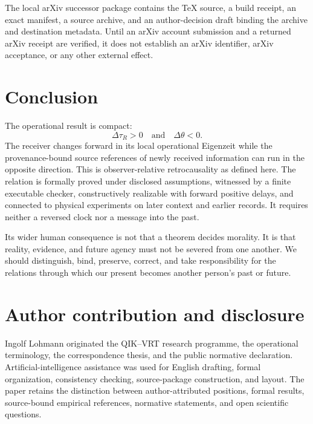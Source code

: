 \documentclass[11pt]{article}
\theoremstyle{remark}
\begin{document}
The local arXiv successor package contains the TeX source, a build receipt,
an exact manifest, a source archive, and an author-decision draft binding the
archive and destination metadata.  Until an arXiv account submission and a
returned arXiv receipt are verified, it does not establish an arXiv identifier,
arXiv acceptance, or any other external effect.

\section{Conclusion}

The operational result is compact:
\[
  \boxed{\Delta\tau_R>0\quad\text{and}\quad\Delta\theta<0.}
\]
The receiver changes forward in its local operational Eigenzeit while the
provenance-bound source references of newly received information can run in
the opposite direction.  This is observer-relative retrocausality as defined
here.  The relation is formally proved under disclosed assumptions, witnessed
by a finite executable checker, constructively realizable with forward
positive delays, and connected to physical experiments on later context and
earlier records.  It requires neither a reversed clock nor a message into the
past.

Its wider human consequence is not that a theorem decides morality.  It is
that reality, evidence, and future agency must not be severed from one
another.  We should distinguish, bind, preserve, correct, and take
responsibility for the relations through which our present becomes another
person's past or future.

\section*{Author contribution and disclosure}

Ingolf Lohmann originated the QIK--VRT research programme, the operational
terminology, the correspondence thesis, and the public normative declaration.
Artificial-intelligence assistance was used for English drafting, formal
organization, consistency checking, source-package construction, and layout.
The paper retains the distinction between author-attributed positions, formal
results, source-bound empirical references, normative statements, and open
scientific questions.
\end{document}
